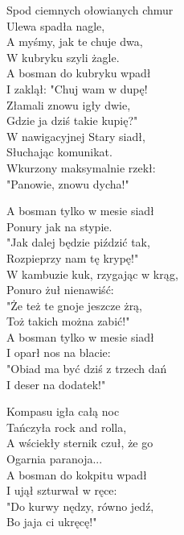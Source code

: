 \vspace{1em}
\begin{multicols}{2}
Spod ciemnych ołowianych chmur \\
Ulewa spadła nagle, \\
A myśmy, jak te chuje dwa, \\
W kubryku szyli żagle. \\

A bosman do kubryku wpadł \\
I zaklął: "Chuj wam w dupę! \\
Złamali znowu igły dwie, \\
Gdzie ja dziś takie kupię?" \\

W nawigacyjnej Stary siadł, \\
Słuchając komunikat. \\
Wkurzony maksymalnie rzekł: \\
"Panowie, znowu dycha!" \\
\columnbreak

A bosman tylko w mesie siadł \\
Ponury jak na stypie. \\
"Jak dalej będzie piździć tak, \\
Rozpieprzy nam tę krypę!" \\

W kambuzie kuk, rzygając w krąg, \\
Ponuro żuł nienawiść: \\
"Że też te gnoje jeszcze żrą, \\
Toż takich można zabić!" \\

A bosman tylko w mesie siadł \\
I oparł nos na blacie: \\
"Obiad ma być dziś z trzech dań \\
I deser na dodatek!" \\
\columnbreak

Kompasu igła całą noc \\
Tańczyła rock and rolla, \\
A wściekły sternik czuł, że go \\
Ogarnia paranoja... \\

A bosman do kokpitu wpadł \\
I ujął szturwał w ręce: \\
"Do kurwy nędzy, równo jedź, \\
Bo jaja ci ukręcę!" \\


\end{multicols}
